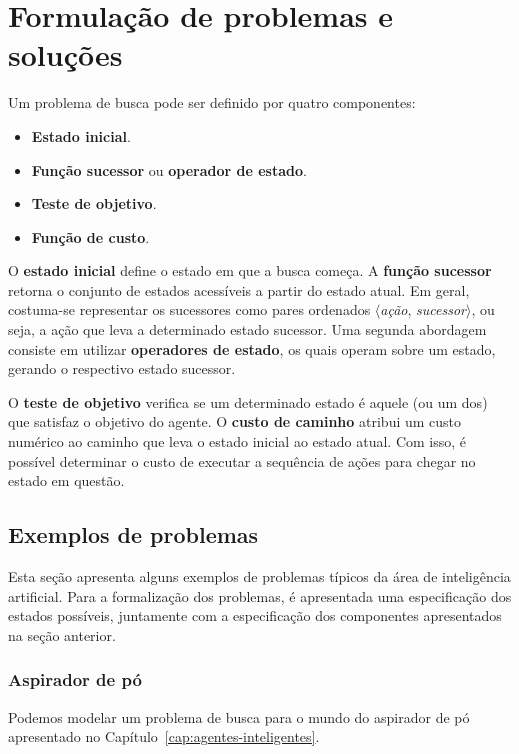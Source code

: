 \section{Formulação de problemas e soluções}

Um problema de busca pode ser definido por quatro componentes:
\begin{itemize}
	\item \textbf{Estado inicial}.
	\item \textbf{Função sucessor} ou \textbf{operador de estado}.
	\item \textbf{Teste de objetivo}.
	\item \textbf{Função de custo}.
\end{itemize}

O \textbf{estado inicial} define o estado em que a busca começa. A \textbf{função sucessor} retorna o conjunto de estados acessíveis a partir do estado atual. Em geral, costuma-se representar os sucessores como pares ordenados $\langle$\textit{ação}, \textit{sucessor}$\rangle$, ou seja, a ação que leva a determinado estado sucessor. Uma segunda abordagem consiste em utilizar \textbf{operadores de estado}, os quais operam sobre um estado, gerando o respectivo estado sucessor.

O \textbf{teste de objetivo} verifica se um determinado estado é aquele (ou um dos) que satisfaz o objetivo do agente. O \textbf{custo de caminho} atribui um custo numérico ao caminho que leva o estado inicial ao estado atual. Com isso, é possível determinar o custo de executar a sequência de ações para chegar no estado em questão.

\subsection{Exemplos de problemas}

Esta seção apresenta alguns exemplos de problemas típicos da área de inteligência artificial. Para a formalização dos problemas, é apresentada uma especificação dos estados possíveis, juntamente com a especificação dos componentes apresentados na seção anterior.

\subsubsection{Aspirador de pó}

Podemos modelar um problema de busca para o mundo do aspirador de pó apresentado no Capítulo~\ref{cap:agentes-inteligentes}.

